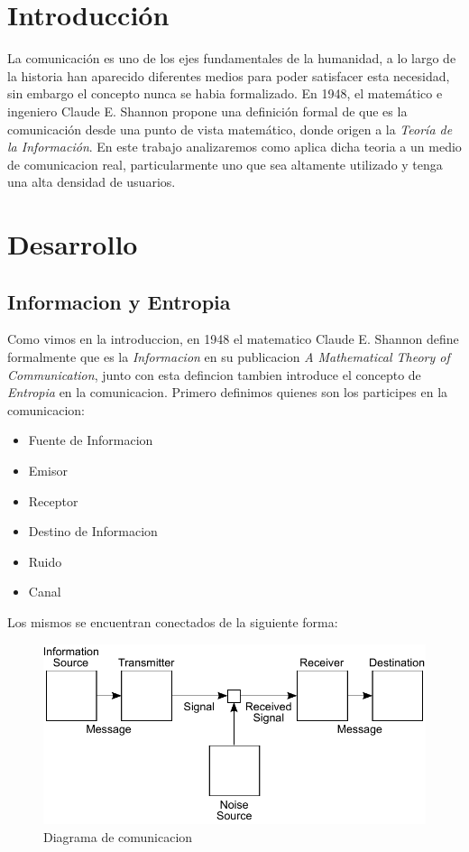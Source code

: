 \section{Introducción}

La comunicación es uno de los ejes fundamentales de la humanidad, a lo largo de la historia han aparecido diferentes medios para poder satisfacer esta necesidad, sin embargo el concepto nunca se habia formalizado. En 1948, el matemático e ingeniero Claude E. Shannon propone una definición formal de que es la comunicación desde una punto de vista matemático, donde origen a la \textit{Teoría de la Información}. En este trabajo analizaremos como aplica dicha teoria a un medio de comunicacion real, particularmente uno que sea altamente utilizado y tenga una alta densidad de usuarios.

\section{Desarrollo}

\subsection{Informacion y Entropia}

Como vimos en la introduccion, en 1948 el matematico Claude E. Shannon define formalmente que es la \textit{Informacion} en su publicacion \textit{A Mathematical Theory of Communication}, junto con esta defincion tambien introduce el concepto de \textit{Entropia} en la comunicacion. Primero definimos quienes son los participes en la comunicacion:

\begin{itemize}
	\item Fuente de Informacion
	\item Emisor
	\item Receptor
	\item Destino de Informacion
	\item Ruido
	\item Canal
\end{itemize}

Los mismos se encuentran conectados de la siguiente forma:

\begin{figure}[ht]
\begin{center}
\includegraphics[width=0.6\columnwidth]{graficos/Shannon.pdf}
\caption{Diagrama de comunicacion}
\end{center}
\end{figure}

